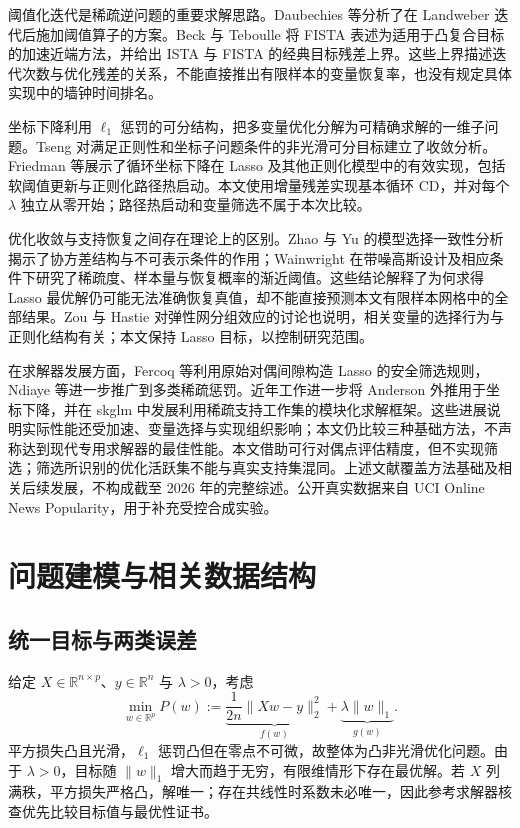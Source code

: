 阈值化迭代是稀疏逆问题的重要求解思路。Daubechies 等分析了在 Landweber 迭代后施加阈值算子的方案\cite{daubechies2004}。Beck 与 Teboulle 将 FISTA 表述为适用于凸复合目标的加速近端方法，并给出 ISTA 与 FISTA 的经典目标残差上界\cite{beck2009}。这些上界描述迭代次数与优化残差的关系，不能直接推出有限样本的变量恢复率，也没有规定具体实现中的墙钟时间排名。

坐标下降利用 $\ell_1$ 惩罚的可分结构，把多变量优化分解为可精确求解的一维子问题。Tseng 对满足正则性和坐标子问题条件的非光滑可分目标建立了收敛分析\cite{tseng2001}。Friedman 等展示了循环坐标下降在 Lasso 及其他正则化模型中的有效实现，包括软阈值更新与正则化路径热启动\cite{friedman2010}。本文使用增量残差实现基本循环 CD，并对每个 $\lambda$ 独立从零开始；路径热启动和变量筛选不属于本次比较。

优化收敛与支持恢复之间存在理论上的区别。Zhao 与 Yu 的模型选择一致性分析揭示了协方差结构与不可表示条件的作用\cite{zhao2006}；Wainwright 在带噪高斯设计及相应条件下研究了稀疏度、样本量与恢复概率的渐近阈值\cite{wainwright2009}。这些结论解释了为何求得 Lasso 最优解仍可能无法准确恢复真值，却不能直接预测本文有限样本网格中的全部结果。Zou 与 Hastie 对弹性网分组效应的讨论也说明，相关变量的选择行为与正则化结构有关\cite{zou2005}；本文保持 Lasso 目标，以控制研究范围。

在求解器发展方面，Fercoq 等利用原始对偶间隙构造 Lasso 的安全筛选规则\cite{fercoq2015}，Ndiaye 等进一步推广到多类稀疏惩罚\cite{ndiaye2017}。近年工作进一步将 Anderson 外推用于坐标下降\cite{bertrand2021}，并在 skglm 中发展利用稀疏支持工作集的模块化求解框架\cite{moufad2025}。这些进展说明实际性能还受加速、变量选择与实现组织影响；本文仍比较三种基础方法，不声称达到现代专用求解器的最佳性能。本文借助可行对偶点评估精度，但不实现筛选；筛选所识别的优化活跃集不能与真实支持集混同。上述文献覆盖方法基础及相关后续发展，不构成截至 2026 年的完整综述。公开真实数据来自 UCI Online News Popularity\cite{fernandes2015}，用于补充受控合成实验。

\section{问题建模与相关数据结构}
\subsection{统一目标与两类误差}
给定 $X\in\mathbb{R}^{n\times p}$、$y\in\mathbb{R}^{n}$ 与 $\lambda>0$，考虑
\begin{equation}
  \min_{w\in\mathbb{R}^p} P(w)
  :=\underbrace{\frac{1}{2n}\|Xw-y\|_2^2}_{f(w)}
    +\underbrace{\lambda\|w\|_1}_{g(w)}.
  \label{eq:theory_primal}
\end{equation}
平方损失凸且光滑，$\ell_1$ 惩罚凸但在零点不可微，故整体为凸非光滑优化问题。由于 $\lambda>0$，目标随 $\|w\|_1$ 增大而趋于无穷，有限维情形下存在最优解。若 $X$ 列满秩，平方损失严格凸，解唯一；存在共线性时系数未必唯一，因此参考求解器核查优先比较目标值与最优性证书。

